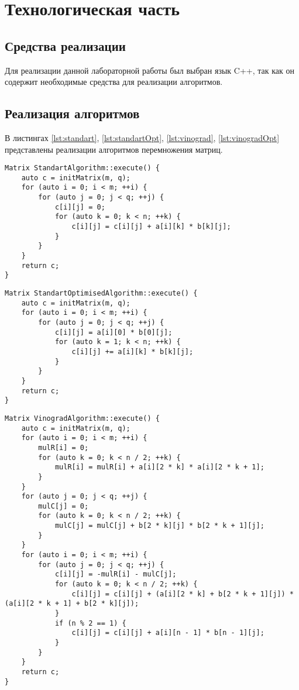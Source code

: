 \chapter{Технологическая часть}

\section{Средства реализации}

Для реализации данной лабораторной работы был выбран язык C++, так как он содержит необходимые средства для реализации алгоритмов. 

\section{Реализация алгоритмов}

В листингах \ref{lst:standart}, \ref{lst:standartOpt}, \ref{lst:vinograd}, \ref{lst:vinogradOpt}  представлены реализации алгоритмов перемножения матриц.

\begin{lstlisting}[label=lst:standart,caption=Стандартный алгоритм перемножения матриц]
Matrix StandartAlgorithm::execute() {
	auto c = initMatrix(m, q);
	for (auto i = 0; i < m; ++i) {
		for (auto j = 0; j < q; ++j) {
			c[i][j] = 0;
			for (auto k = 0; k < n; ++k) {
				c[i][j] = c[i][j] + a[i][k] * b[k][j];
			}
		}
	}
	return c;
}
\end{lstlisting}

\begin{lstlisting}[label=lst:standartOpt,caption=Стандартный алгоритм с оптимизациями]
Matrix StandartOptimisedAlgorithm::execute() {
	auto c = initMatrix(m, q);
	for (auto i = 0; i < m; ++i) {
		for (auto j = 0; j < q; ++j) {
			c[i][j] = a[i][0] * b[0][j];
			for (auto k = 1; k < n; ++k) {
				c[i][j] += a[i][k] * b[k][j];
			}
		}
	}
	return c;
}
\end{lstlisting}

\begin{lstlisting}[label=lst:vinograd,caption=Алгоритм Винограда]
Matrix VinogradAlgorithm::execute() {
	auto c = initMatrix(m, q);
	for (auto i = 0; i < m; ++i) {
		mulR[i] = 0;
		for (auto k = 0; k < n / 2; ++k) {
			mulR[i] = mulR[i] + a[i][2 * k] * a[i][2 * k + 1];
		}
	}
	for (auto j = 0; j < q; ++j) {
		mulC[j] = 0;
		for (auto k = 0; k < n / 2; ++k) {
			mulC[j] = mulC[j] + b[2 * k][j] * b[2 * k + 1][j];
		}
	}
	for (auto i = 0; i < m; ++i) {
		for (auto j = 0; j < q; ++j) {
			c[i][j] = -mulR[i] - mulC[j];
			for (auto k = 0; k < n / 2; ++k) {
				c[i][j] = c[i][j] + (a[i][2 * k] + b[2 * k + 1][j]) * (a[i][2 * k + 1] + b[2 * k][j]);
			}
			if (n % 2 == 1) {
				c[i][j] = c[i][j] + a[i][n - 1] * b[n - 1][j];
			}
		}
	}
	return c;
}
\end{lstlisting}

